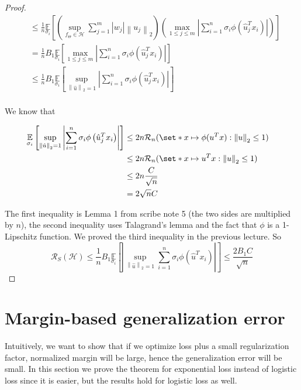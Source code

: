 \documentclass[11pt]{article}
\newcommand{\HH}{\mathcal{H}}
\newcommand{\RR}{\mathcal{R}}
\newcommand{\IE}{\mathbb{E}}
\newcommand{\normt}[1]{\left\lVert#1\right\rVert_2}
\newcommand{\abs}[1]{\left\lvert#1\right\rvert}
\DeclarePairedDelimiter\set\{\}
\begin{document}
\begin{proof}
\begin{align*}
		                                                        & \leq \frac{1}{n} \underset{\sigma_i}{\IE}
		\left[\left(\underset{f_\Theta \in \HH}{\sup} \sum\limits_{j=1}^m \abs{w_j}\normt{u_j}\right)
			\left( \underset{1\leq j \leq m}{\max}\abs{\sum\limits_{i=1}^n
				\sigma_i \phi\left(\hat{u}_j^T x_i\right)}\right)\right]                                                                                                                      \\
		                                                        & = \frac{1}{n} B_1 \underset{\sigma_i}{\IE} \left[\underset{1 \leq j\leq m}{\max}
			\abs{\sum\limits_{i=1}^n \sigma_i \phi\left(\hat{u}_j^T x_i\right)}\right]                                                                                                               \\
		                                                        & \leq \frac{1}{n} B_1
		\underset{\sigma_i}{\IE} \left[\underset{\normt{\hat{u}}=1}{\sup}
			\abs{\sum\limits_{i=1}^n \sigma_i \phi\left(\hat{u}_j^T x_i\right)}\right]                                                                                                    \\
	\end{align*}

	We know that

	\begin{align*}
		\underset{\sigma_i}{\IE} \left[\underset{\normt{\hat{u}}=1}{\sup}
			\abs{\sum\limits_{i=1}^n \sigma_i \phi\left(\hat{u}_j^T x_i\right)}\right]
		 & \leq 2n\RR_n(\set*{x \mapsto \phi(u^T x): \normt{u} \leq 1}) &  & \text{} \\
		 & \leq 2n \RR_n(\set*{x \mapsto u^T x: \normt{u} \leq 1})                   \\
		 & \leq 2n \frac{C}{\sqrt{n}}                                                \\
		 & = 2\sqrt{n}C
	\end{align*}

	The first inequality is Lemma 1 from scribe note 5 (the two sides are multiplied by $n$),
	the second inequality uses Talagrand's lemma and the fact that $\phi$ is a 1-Lipschitz function.
	We proved the third inequality in the previous lecture. So
	$$\RR_S(\HH) \leq \frac{1}{n} B_1 \underset{\sigma_i}{\IE}
		\left[\abs{\underset{\normt{\hat{u}}=1}{\sup}\sum\limits_{i=1}^n
				\sigma_i \phi(\hat{u}^T x_i)} \right] \leq \frac{2B_1 C}{\sqrt{n}}$$
\end{proof}

\section{Margin-based generalization error}
Intuitively, we want to show that if we optimize loss plus a small regularization factor, normalized margin will be large, hence the generalization error will be small. In this section we prove the theorem for
exponential loss instead of logistic loss since it is easier, but the results hold for logistic loss as well.
\end{document}
